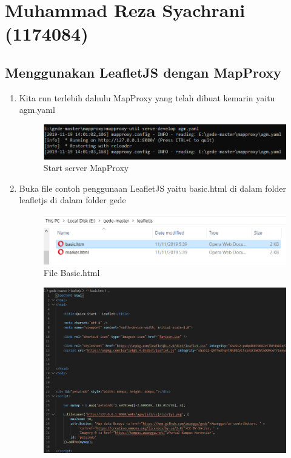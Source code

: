 \section{Muhammad Reza Syachrani (1174084)}
\subsection{Menggunakan LeafletJS dengan MapProxy}
\begin{enumerate}
    \item Kita run terlebih dahulu MapProxy yang telah dibuat kemarin yaitu agm.yaml
    \hfill\break
    \begin{figure}[H]
		\includegraphics[width=12cm]{figures/Tugas5/1174084/1.png}
		\centering
		\caption{Start server MapProxy}
	\end{figure}
    \item Buka file contoh penggunaan LeafletJS yaitu basic.html di dalam folder leafletjs di dalam folder gede
    \hfill\break
    \begin{figure}[H]
		\includegraphics[width=12cm]{figures/Tugas5/1174084/2.png}
		\centering
		\caption{File Basic.html}
	\end{figure}
	\begin{figure}[H]
		\includegraphics[width=12cm]{figures/Tugas5/1174084/7.png}

\end{figure}
\end{enumerate}
